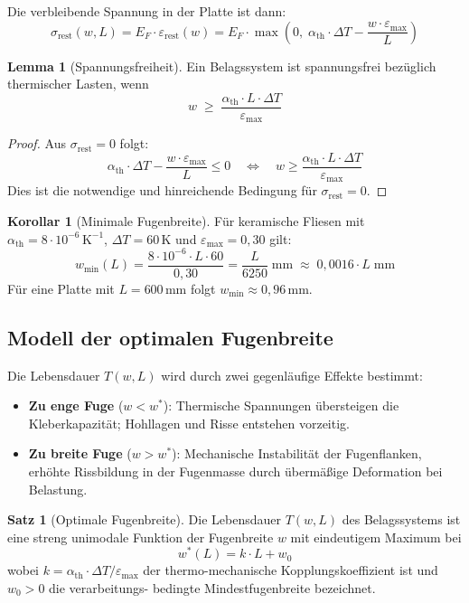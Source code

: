 ﻿\documentclass[a4paper,12pt]{article}
\theoremstyle{definition}
\newtheorem{satz}{Satz}
\newtheorem{lemma}{Lemma}
\newtheorem{korollar}{Korollar}
\begin{document}
Die verbleibende Spannung in der Platte ist dann:
\[
\sigma_{\text{rest}}(w, L) = E_F \cdot \varepsilon_{\text{rest}}(w)
= E_F \cdot \max\!\left(0,\;\alpha_{\text{th}} \cdot \Delta T - \frac{w \cdot \varepsilon_{\max}}{L}\right)
\]

\begin{lemma}[Spannungsfreiheit]
	\label{lem:spannungsfreiheit}
	Ein Belagssystem ist spannungsfrei bezüglich thermischer Lasten, wenn
	\[
	w \;\geq\; \frac{\alpha_{\text{th}} \cdot L \cdot \Delta T}{\varepsilon_{\max}}
	\]
\end{lemma}

\begin{proof}
	Aus $\sigma_{\text{rest}} = 0$ folgt:
	\[
	\alpha_{\text{th}} \cdot \Delta T - \frac{w \cdot \varepsilon_{\max}}{L} \leq 0
	\quad\Longleftrightarrow\quad
	w \geq \frac{\alpha_{\text{th}} \cdot L \cdot \Delta T}{\varepsilon_{\max}}
	\]
	Dies ist die notwendige und hinreichende Bedingung für
	$\sigma_{\text{rest}} = 0$.
\end{proof}

\begin{korollar}[Minimale Fugenbreite]
	\label{kor:minbreite}
	Für keramische Fliesen mit $\alpha_{\text{th}} = 8 \cdot 10^{-6}\,\text{K}^{-1}$,
	$\Delta T = 60\,\text{K}$ und $\varepsilon_{\max} = 0{,}30$ gilt:
	\[
	w_{\min}(L) = \frac{8 \cdot 10^{-6} \cdot L \cdot 60}{0{,}30}
	= \frac{L}{6250}\;\text{mm} \;\approx\; 0{,}0016 \cdot L\;\text{mm}
	\]
	Für eine Platte mit $L = 600\,\text{mm}$ folgt $w_{\min} \approx 0{,}96\,\text{mm}$.
\end{korollar}

\subsection{Modell der optimalen Fugenbreite}

Die Lebensdauer $T(w, L)$ wird durch zwei gegenläufige Effekte bestimmt:

\begin{itemize}
	\item \textbf{Zu enge Fuge} ($w < w^*$): Thermische Spannungen übersteigen
	      die Kleberkapazität; Hohllagen und Risse entstehen vorzeitig.
	\item \textbf{Zu breite Fuge} ($w > w^*$): Mechanische Instabilität der
	      Fugenflanken, erhöhte Rissbildung in der Fugenmasse durch
	      übermäßige Deformation bei Belastung.
\end{itemize}

\begin{satz}[Optimale Fugenbreite]
	\label{satz:optimum}
	Die Lebensdauer $T(w, L)$ des Belagssystems ist eine streng unimodale
	Funktion der Fugenbreite $w$ mit eindeutigem Maximum bei
	\[
	w^*(L) = k \cdot L + w_0
	\]
	wobei $k = \alpha_{\text{th}} \cdot \Delta T / \varepsilon_{\max}$ der
	thermo-mechanische Kopplungskoeffizient ist und $w_0 > 0$ die verarbeitungs-
	bedingte Mindestfugenbreite bezeichnet.
\end{satz}
\end{document}
